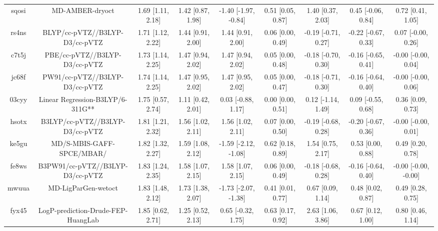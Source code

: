 \documentclass{article}
\begin{document}
\begin{center}
\begin{longtable}{|ccccccccc|}
 sqosi &                                    MD-AMBER-dryoct &  1.69 [1.11, 2.18] &  1.42 [0.87, 1.98] &  -1.40 [-1.97, -0.84] &  0.51 [0.05, 0.87] &    1.40 [0.37, 2.03] &   0.45 [-0.06, 0.84] &     0.72 [0.41, 1.05] \\
 rs4ns &                     BLYP/cc-pVTZ//B3LYP-D3/cc-pVTZ &  1.71 [1.12, 2.22] &  1.44 [0.91, 2.00] &     1.44 [0.91, 2.00] &  0.06 [0.00, 0.49] &  -0.19 [-0.71, 0.27] &  -0.22 [-0.67, 0.33] &    0.07 [-0.00, 0.26] \\
 c7t5j &                      PBE/cc-pVTZ//B3LYP-D3/cc-pVTZ &  1.73 [1.14, 2.25] &  1.47 [0.94, 2.02] &     1.47 [0.94, 2.02] &  0.05 [0.00, 0.48] &  -0.18 [-0.70, 0.30] &  -0.16 [-0.65, 0.41] &   -0.00 [-0.00, 0.04] \\
 jc68f &                     PW91/cc-pVTZ//B3LYP-D3/cc-pVTZ &  1.74 [1.14, 2.25] &  1.47 [0.95, 2.02] &     1.47 [0.95, 2.02] &  0.05 [0.00, 0.47] &  -0.18 [-0.71, 0.30] &  -0.16 [-0.64, 0.40] &   -0.00 [-0.00, 0.06] \\
 03cyy &                   Linear Regression-B3LYP/6-311G** &  1.75 [0.57, 2.74] &  1.11 [0.42, 2.01] &    0.03 [-0.88, 1.17] &  0.00 [0.00, 0.51] &   0.12 [-1.14, 1.49] &   0.09 [-0.55, 0.68] &     0.36 [0.09, 0.73] \\
 hsotx &                    B3LYP/cc-pVTZ//B3LYP-D3/cc-pVTZ &  1.81 [1.21, 2.32] &  1.56 [1.02, 2.11] &     1.56 [1.02, 2.11] &  0.07 [0.00, 0.50] &  -0.19 [-0.68, 0.28] &  -0.20 [-0.67, 0.36] &   -0.00 [-0.00, 0.01] \\
 ke5gu &                          MD/S-MBIS-GAFF-SPCE/MBAR/ &  1.82 [1.32, 2.27] &  1.59 [1.08, 2.12] &  -1.59 [-2.12, -1.08] &  0.62 [0.18, 0.89] &    1.54 [0.75, 2.17] &    0.53 [0.00, 0.88] &     0.49 [0.20, 0.78] \\
 fe8ws &                   B3PW91/cc-pVTZ//B3LYP-D3/cc-pVTZ &  1.83 [1.24, 2.35] &  1.58 [1.07, 2.15] &     1.58 [1.07, 2.15] &  0.06 [0.00, 0.49] &  -0.18 [-0.68, 0.28] &  -0.16 [-0.64, 0.40] &  -0.00 [-0.00, -0.00] \\
 mwuua &                                MD-LigParGen-wetoct &  1.83 [1.48, 2.12] &  1.73 [1.38, 2.07] &  -1.73 [-2.07, -1.38] &  0.41 [0.01, 0.77] &    0.67 [0.09, 1.14] &    0.48 [0.02, 0.87] &     0.49 [0.28, 0.75] \\
 fyx45 &                 LogP-prediction-Drude-FEP-HuangLab &  1.85 [0.62, 2.71] &  1.25 [0.52, 2.13] &    0.65 [-0.32, 1.75] &  0.63 [0.17, 0.92] &    2.63 [1.06, 3.86] &    0.67 [0.12, 1.00] &     0.80 [0.46, 1.14] \\

\end{longtable}
\end{center}
\end{document}
